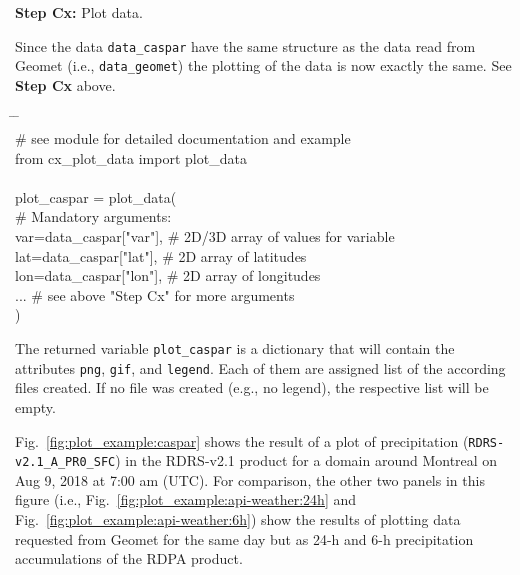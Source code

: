 \documentclass[10pt,a4paper,titlepage,parskip]{scrartcl}
\newenvironment{ttfont}{\fontfamily{\ttdefault}\selectfont}{\par}
\newcommand{\GRAU}[1]{\textcolor{ufzgray2}{#1}}
\begin{document}
\textbf{Step Cx:} Plot data.

Since the data \texttt{data\_caspar} have the same structure as the data read from Geomet (i.e., \texttt{data\_geomet}) the plotting of the data is now exactly the same. See \textbf{Step Cx} above. 

\begin{framed}
	\vspace*{-1.2cm}
	\begin{ttfont}
		\begin{tabbing}
			\hspace{1.0cm} \= \hspace{5.2cm} \= \kill \\[4pt]
			\GRAU{\# see module for detailed documentation and example}\\
			from cx\_plot\_data import plot\_data\\
			\\
			plot\_caspar = plot\_data(\\
			\> \GRAU{\# Mandatory arguments:}\\
			\> var=data\_caspar["var"], \> \GRAU{\# 2D/3D array of values for variable}\\
			\> lat=data\_caspar["lat"], \> \GRAU{\# 2D array of latitudes}\\
			\> lon=data\_caspar["lon"], \> \GRAU{\# 2D array of longitudes}\\
			\> ... \> \GRAU{\# see above "Step Cx" for more arguments }\\
			\> ) \> 
		\end{tabbing}
	\end{ttfont}
	\vspace*{-0.3cm}
\end{framed}
\vspace*{-0.3cm}
The returned variable \texttt{plot\_caspar} is a dictionary that will contain the attributes \texttt{png}, \texttt{gif}, and \texttt{legend}. Each of them are assigned list of the according files created. If no file was created (e.g., no legend), the respective list will be empty.

Fig.~\ref{fig:plot_example:caspar} shows the result of a plot of precipitation (\texttt{RDRS-v2.1\_A\_PR0\_SFC}) in the RDRS-v2.1 product for a domain around Montreal on Aug 9, 2018 at 7:00 am (UTC). For comparison, the other two panels in this figure (i.e., Fig.~\ref{fig:plot_example:api-weather:24h} and Fig.~\ref{fig:plot_example:api-weather:6h}) show the results of plotting data requested from Geomet for the same day but as 24-h and 6-h precipitation accumulations of the RDPA product.
\end{document}
